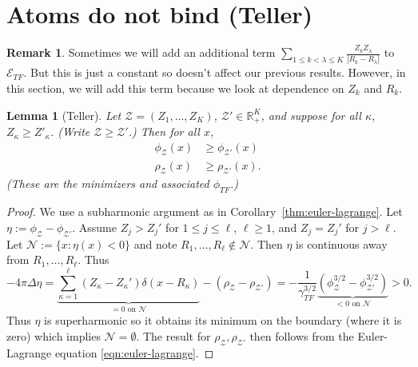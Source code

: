 \documentclass[11pt]{amsart}
\newcommand{\R}{\mathbb{R}}
\newtheorem{lem}{Lemma}
\theoremstyle{definition}
\theoremstyle{definition}
\theoremstyle{definition}
\newtheorem*{rmk}{Remark}
\numberwithin{equation}{section}
\begin{document}
\section{Atoms do not bind (Teller)}
\begin{rmk}
Sometimes we will add an additional term $\sum_{1\le k<\lambda\le K}\frac{Z_kZ_\lambda}{|R_k-R_\lambda|}$ to $\mathcal{E}_{TF}$. But this is just a constant so doesn't affect our previous results. However, in this section, we will add this term because we look at dependence on $Z_k$ and $R_k$.
\end{rmk}

\begin{lem}[Teller]
Let $\mathcal{Z}=(Z_1,\ldots,Z_K)$, $\mathcal{Z}'\in\R_+^K$, and suppose for all $\kappa$, $Z_\kappa\ge Z'_\kappa$. (Write $\mathcal{Z}\ge\mathcal{Z}'$.) Then for all $x$,
\begin{align}
\phi_\mathcal{Z}(x)&\ge\phi_{\mathcal{Z}'}(x)\\
\rho_\mathcal{Z}(x)&\ge\rho_{\mathcal{Z}'}(x).
\end{align}
(These are the minimizers and associated $\phi_{TF}$.)
\end{lem}
\begin{proof}
We use a subharmonic argument as in Corollary~\ref{thm:euler-lagrange}.
Let $\eta:=\phi_\mathcal{Z}-\phi_{\mathcal{Z'}}$. Assume $Z_j>Z_j'$ for $1\le j\le \ell$, $\ell\ge1$, and $Z_j=Z_j'$ for $j>\ell$. Let $\mathcal{N}:=\{x:\eta(x)<0\}$ and note $R_1,\ldots,R_\ell\not\in\mathcal{N}$. Then $\eta$ is continuous away from $R_1,\ldots,R_\ell$. Thus
\[
-4\pi\Delta\eta=\underbrace{\sum_{\kappa=1}^{\ell}(Z_\kappa-Z_\kappa')\delta(x-R_\kappa)}_{=0\text{ on }\mathcal{N}}-(\rho_\mathcal{Z}-\rho_{\mathcal{Z}'})=-\frac{1}{\gamma_{TF}^{3/2}}\underbrace{(\phi_\mathcal{Z}^{3/2}-\phi_{\mathcal{Z}'}^{3/2})}_{<0\text{ on }\mathcal{N}}>0.
\]
Thus $\eta$ is superharmonic so it obtains its minimum on the boundary (where it is zero) which implies $\mathcal{N}=\emptyset$. The result for $\rho_\mathcal{Z},\rho_\mathcal{Z'}$ then follows from the Euler-Lagrange equation \eqref{eqn:euler-lagrange}.
\end{proof}
\end{document}

